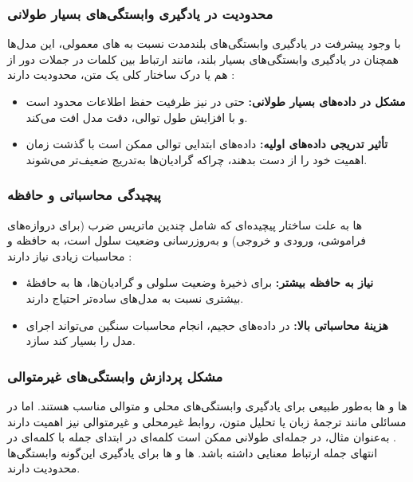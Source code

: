\subsubsection{محدودیت در یادگیری وابستگی‌های بسیار طولانی}
با وجود پیشرفت  در یادگیری وابستگی‌های بلندمدت نسبت به های معمولی، این مدل‌ها همچنان در یادگیری وابستگی‌های بسیار بلند، مانند ارتباط بین کلمات در جملات دور از هم یا درک ساختار کلی یک متن، محدودیت دارند
\cite{hochreiter1998vanishing}:
\begin{itemize}
	\item \textbf{مشکل در داده‌های بسیار طولانی:}  
	حتی در  نیز ظرفیت حفظ اطلاعات محدود است و با افزایش طول توالی، دقت مدل افت می‌کند.
	
	\item \textbf{تأثیر تدریجی داده‌های اولیه:}  
	داده‌های ابتدایی توالی ممکن است با گذشت زمان اهمیت خود را از دست بدهند، چراکه گرادیان‌ها به‌تدریج ضعیف‌تر می‌شوند.
\end{itemize}

\subsubsection{پیچیدگی محاسباتی و حافظه}
ها به علت ساختار پیچیده‌ای که شامل چندین ماتریس ضرب (برای دروازه‌های فراموشی، ورودی و خروجی) و به‌روزرسانی وضعیت سلول است، به حافظه و محاسبات زیادی نیاز دارند
\cite{goodfellow2016deep}:
\begin{itemize}
	\item \textbf{نیاز به حافظه بیشتر:}  
	برای ذخیرهٔ وضعیت سلولی و گرادیان‌ها، ها به حافظهٔ بیشتری نسبت به مدل‌های ساده‌تر احتیاج دارند.
	
	\item \textbf{هزینهٔ محاسباتی بالا:}  
	در داده‌های حجیم، انجام محاسبات سنگین می‌تواند اجرای مدل را بسیار کند سازد.
\end{itemize}

\subsubsection{مشکل پردازش وابستگی‌های غیرمتوالی}
ها و ها به‌طور طبیعی برای یادگیری وابستگی‌های محلی و متوالی مناسب هستند. اما در مسائلی مانند ترجمهٔ زبان یا تحلیل متون، روابط غیرمحلی و غیرمتوالی نیز اهمیت دارند
\cite{bahdanau2014neural}.
به‌عنوان مثال، در جمله‌ای طولانی ممکن است کلمه‌ای در ابتدای جمله با کلمه‌ای در انتهای جمله ارتباط معنایی داشته باشد. ها و ها برای یادگیری این‌گونه وابستگی‌ها محدودیت دارند.

